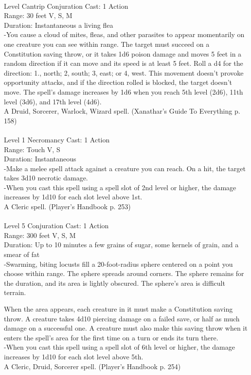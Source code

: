 \documentclass[10pt,twocolumn]{report}
\begin{document}
 \\
Level Cantrip \quad Conjuration \quad Cast: 1 Action\\
Range: 30 feet \quad V, S, M\\
Duration: Instantaneous \quad a living flea\\
-You cause a cloud of mites, fleas, and other parasites to appear momentarily on one creature you can see within range. The target must succeed on a Constitution saving throw, or it takes 1d6 poison damage and moves 5 feet in a random direction if it can move and its speed is at least 5 feet. Roll a d4 for the direction: 1., north; 2, south; 3, east; or 4, west. This movement doesn’t provoke opportunity attacks, and if the direction rolled is blocked, the target doesn't move.
The spell’s damage increases by 1d6 when you reach 5th level (2d6), 11th level (3d6), and 17th level (4d6).\\
A Druid, Sorcerer, Warlock, Wizard spell. (Xanathar's Guide To Everything p. 158) \\


 \\
Level 1 \quad Necromancy \quad Cast: 1 Action\\
Range: Touch \quad V, S\\
Duration: Instantaneous \quad \\
-Make a melee spell attack against a creature you can reach. On a hit, the target takes 3d10 necrotic damage.\\
-When you cast this spell using a spell slot of 2nd level or higher, the damage increases by 1d10 for each slot level above 1st.\\
A Cleric spell. (Player's Handbook p. 253) \\


 \\
Level 5 \quad Conjuration \quad Cast: 1 Action\\
Range: 300 feet \quad V, S, M\\
Duration: Up to 10 minutes \quad a few grains of sugar, some kernels of grain, and a smear of fat\\
-Swarming, biting locusts fill a 20-foot-radius sphere centered on a point you choose within range. The sphere spreads around corners. The sphere remains for the duration, and its area is lightly obscured. The sphere’s area is difficult terrain.

When the area appears, each creature in it must make a Constitution saving throw. A creature takes 4d10 piercing damage on a failed save, or half as much damage on a successful one. A creature must also make this saving throw when it enters the spell’s area for the first time on a turn or ends its turn there.\\
-When you cast this spell using a spell slot of 6th level or higher, the damage increases by 1d10 for each slot level above 5th.\\
A Cleric, Druid, Sorcerer spell. (Player's Handbook p. 254) \\
\end{document}
